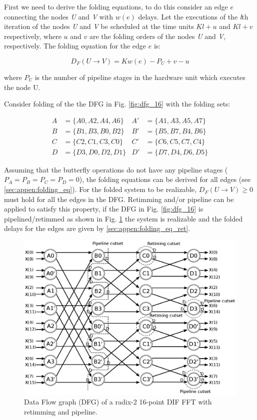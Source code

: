 \documentclass[journal,comsoc]{IEEEtran}
\begin{document}
First we need to derive the folding equations, to do this consider an edge $e$ connecting the nodes \textit{U} and \textit{V} with $w(e)$ delays. Let the executions of the \textit{l}th iteration of the nodes \textit{U} and \textit{V} be scheduled at the time units $Kl+u$ and $Kl+v$ respectively, where $u$ and $v$ are the folding orders of the nodes \textit{U} and \textit{V}, respectively. The folding equation for the edge $e$ is:

\begin{equation}
    D_F(U \to V) = Kw(e)-P_U+v-u
\end{equation}

where $P_U$ is the number of pipeline stages in the hardware unit which executes the node U.

Consider folding of the the DFG in Fig. \ref{fig:dfg_16} with the folding sets:

\begin{align*}
    A&= \{ A0,A2,A4,A6 \}  & A'&= \{ A1,A3,A5,A7 \} \\
    B&=\{ B1,B3,B0,B2 \}  &B'&=\{ B5,B7,B4,B6 \} \\
    C&=\{ C2,C1,C3,C0 \}  &C'&=\{ C6,C5,C7,C4 \} \\ 
    D&=\{ D3,D0,D2,D1 \}  &D'&=\{ D7,D4,D6,D5 \} 
    \label{eq:foldingset_16}
\end{align*}

Assuming that the butterfly operations do not have any pipeline stages ($P_A=P_B=P_C=P_D=0$), the folding equations can be derived for all edges (see \ref{sec:appen:folding_eq}). For the folded system to be realizable, $D_F(U\to V)\geq0$ must hold for all the edges in the DFG. Retimming and/or pipeline can be applied to satisfy this property, if the DFG in Fig. \ref{fig:dfg_16} is pipelined/retimmed as shown in Fig. \ref{fig:dfg_16_ret} the system is realizable and the folded delays for the edges are given by \ref{sec:appen:folding_eq_ret}.

\begin{figure}[htbp]%
\centering
 \includegraphics[width=\linewidth]{Diagramas/Butter16_pipe.eps}%
\caption{Data Flow graph (DFG) of a radix-2 16-point DIF FFT with retimming and pipeline.}
\label{fig:dfg_16_ret}
\end{figure}
\end{document}
